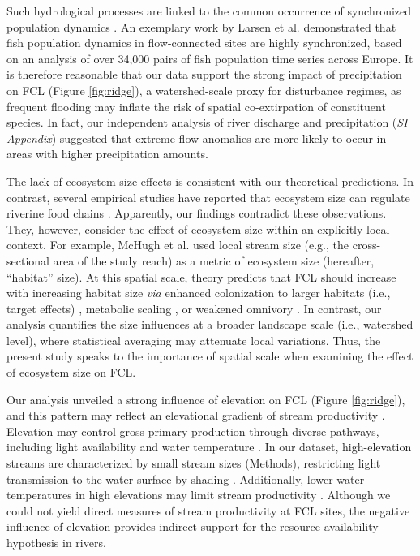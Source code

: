 \documentclass[11pt, class=article, crop=false]{standalone}
\begin{document}
Such hydrological processes are linked to the common occurrence of synchronized population dynamics \citep{sarremejane_drought_2021, larsen_geography_2021}.
An exemplary work by Larsen et al. \citep{larsen_geography_2021} demonstrated that fish population dynamics in flow-connected sites are highly synchronized, based on an analysis of over 34,000 pairs of fish population time series across Europe.
It is therefore reasonable that our data support the strong impact of precipitation on FCL (Figure \ref{fig:ridge}), a watershed-scale proxy for disturbance regimes, as frequent flooding may inflate the risk of spatial co-extirpation of constituent species.
In fact, our independent analysis of river discharge and precipitation (\textit{SI Appendix}) suggested that extreme flow anomalies are more likely to occur in areas with higher precipitation amounts.

The lack of ecosystem size effects is consistent with our theoretical predictions.
In contrast, several empirical studies have reported that ecosystem size can regulate riverine food chains \citep{mchugh_dual_2010, sabo_role_2010, mcintosh_capacity_2018}.
Apparently, our findings contradict these observations.
They, however, consider the effect of ecosystem size within an explicitly local context.
For example, McHugh et al. \citep{mchugh_dual_2010} used local stream size (e.g., the cross-sectional area of the study reach) as a metric of ecosystem size (hereafter, ``habitat'' size).
At this spatial scale, theory predicts that FCL should increase with increasing habitat size \textit{via} enhanced colonization to larger habitats (i.e., target effects) \citep{shibasaki_food_2024}, metabolic scaling \citep{mcintosh_capacity_2018}, or weakened omnivory \citep{ward_mechanistic_2017}.
In contrast, our analysis quantifies the size influences at a broader landscape scale (i.e., watershed level), where statistical averaging may attenuate local variations. 
Thus, the present study speaks to the importance of spatial scale when examining the effect of ecosystem size on FCL.

Our analysis unveiled a strong influence of elevation on FCL (Figure \ref{fig:ridge}), and this pattern may reflect an elevational gradient of stream productivity \citep{marzolf_ecosystem_2021}.
Elevation may control gross primary production through diverse pathways, including light availability and water temperature \citep{marzolf_ecosystem_2021, atkinson_determinants_2018}.
In our dataset, high-elevation streams are characterized by small stream sizes (Methods), restricting light transmission to the water surface by shading \citep{finlay_light-mediated_2011, finlay_human_2013, bernhardt_light_2022}.
Additionally, lower water temperatures in high elevations may limit stream productivity \citep{demars_temperature_2011}.
Although we could not yield direct measures of stream productivity at FCL sites, the negative influence of elevation provides indirect support for the resource availability hypothesis in rivers.
\end{document}
